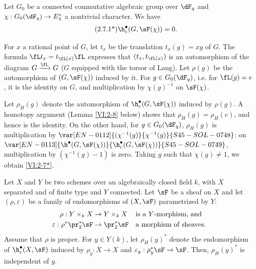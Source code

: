\begin{theorem*}[2.7*]\label{VI:2-7*}
Let $G_0$ be a connected commutative algebraic group over $\dF_q$ and 
$\chi:G_0(\dF_q) \to E_\lambda^\ast$ a nontrivial character. We have 
\begin{align*}\tag{2.7.1*}\label{VI:eq:2-7-1*}
  \h_c^\bullet(G,\sF(\chi)) = 0 \text{.}
\end{align*}
\end{theorem*}

For $x$ a rational point of $G$, let $t_x$ be the translation $t_x(g) = x g$ 
of $G$. The formula $\fL t_x = t_{\fL(x)} \fL$ expresses that $(t_x,t_{\fL(x)})$ 
is an automorphism of the diagram $G\xrightarrow\fL G$ ($G$ equipped with the torsor of 
Lang). Let $\rho(g)$ be the automorphism of $(G,\sF(\chi))$ induced by it. 
For $g\in G_0(\dF_q)$, i.e. for $\fL(g) = e$, it is the identity on $G$, and 
multiplication by $\chi(g)^{-1}$ on $\sF(\chi)$. 

Let $\rho_H(g)$ denote the automorphism of $\h_c^\bullet(G,\sF(\chi))$ induced by 
$\rho(g)$. A homotopy argument (Lemma \ref{VI:2-8} below) shows that 
$\rho_H(g) = \rho_H(e)$, and hence is the identity. On the other hand, for 
$g\in G_0(\dF_q)$, $\rho_H(g)$ is multiplication by 
$\var[EN-0112]{(\chi^{-1}(g)}{\chi^{-1}(g)}{S45-SOL-0748}$: on $\var[EN-0113]{\h^\bullet(G,\sF(\chi))}{\h_c^\bullet(G,\sF(\chi))}{S45-SOL-0749}$, multiplication by 
$(\chi^{-1}(g)-1)$ is zero. Taking $g$ such that $\chi(g)\ne 1$, we obtain 
\ref{VI:2-7*}. 





\begin{lemma_}\label{VI:2-8}
Let $X$ and $Y$ be two schemes over an algebraically closed field $k$, with $X$ 
separated and of finite type and $Y$ connected. Let $\sF$ be a sheaf on $X$ and 
let $(\rho,\varepsilon)$ be a family of endomorphisms of $(X,\sF)$ parametrized 
by $Y$: 
\begin{align*} 
  \rho:Y\times_k X &\to Y\times_k X && \text{is a $Y$-morphism, and} \\
  \varepsilon:\rho^\ast \pr_2^\ast \sF &\to \pr_2^\ast\sF && \text{a morphism of sheaves.} 
\end{align*}
Assume that $\rho$ is proper. For $y\in Y(k)$, let $\rho_H(y)^\ast$ denote 
the endomorphism of $\h_c^\bullet(X,\sF)$ induced by $\rho_y:X\to X$ and 
$\varepsilon_y:\rho_y^\ast\sF\to \sF$. Then, $\rho_H(y)^\ast$ is 
independent of $y$. 
\end{lemma_}

